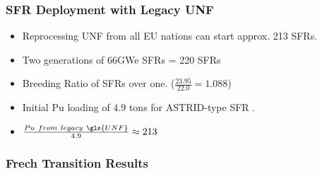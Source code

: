 \begin{frame}
	\frametitle{SFR Deployment with Legacy UNF}
	\begin{itemize}
		\item Reprocessing UNF from all EU nations can start approx. 213 SFRs.
		\item Two generations of 66GWe SFRs = 220 SFRs
		\item Breeding Ratio of SFRs over one. ($\frac{23.95}{22.0} = 1.088$)
		\item Initial Pu loading of $4.9$ tons for ASTRID-type SFR \cite{marsaultmarie-sophie_pre-conceptual_2012}.
		\item $\frac{Pu \ from \ legacy \ \gls{UNF}}{4.9} \approx 213$
	\end{itemize}
\end{frame}

\begin{frame}
	\frametitle{Frech Transition Results}
	
\begin{table}[h]
	\centering
		\caption {\gls{SFR} Simulation Results}
		\label{tab:sfr_sim_result}
\end {table}


\end{frame}


